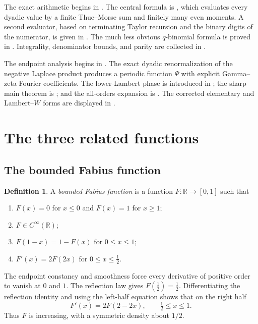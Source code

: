 \documentclass[11pt]{article}
\numberwithin{equation}{section}
\theoremstyle{definition}
\newtheorem{definition}[theorem]{Definition}
\theoremstyle{remark}
\newcommand{\R}{\mathbb{R}}
\newcommand{\half}{\tfrac12}
\begin{document}
The exact arithmetic begins in .  The central
formula is , which evaluates every dyadic value by a
finite Thue--Morse sum and finitely many even moments.  A second evaluator,
based on terminating Taylor recursion and the binary digits of the numerator,
is given in .  The much less obvious
$q$-binomial formula is proved in .  Integrality,
denominator bounds, and parity are collected in .

The endpoint analysis begins in .  The exact dyadic
renormalization of the negative Laplace product produces a periodic function
$\Psi$ with explicit Gamma--zeta Fourier coefficients.  The lower-Lambert
phase is introduced in ; the sharp main theorem is
; and the all-orders expansion is
.  The corrected elementary and Lambert--$W$ forms
are displayed in .

\section{The three related functions}\label{sec:three-functions}

\subsection{The bounded Fabius function}

\begin{definition}\label{def:bounded-fabius}
A \emph{bounded Fabius function} is a function $F:\R\to[0,1]$ such that
\begin{enumerate}[label=\textup{(\roman*)}]
\item $F(x)=0$ for $x\le0$ and $F(x)=1$ for $x\ge1$;
\item $F\in C^\infty(\R)$;
\item $F(1-x)=1-F(x)$ for $0\le x\le1$;
\item $F'(x)=2F(2x)$ for $0\le x\le\half$.
\end{enumerate}
\end{definition}

The endpoint constancy and smoothness force every derivative of positive
order to vanish at $0$ and $1$.  The reflection law gives $F(\half)=\half$.
Differentiating the reflection identity and using the left-half equation
shows that on the right half
\begin{equation}\label{eq:F-right-derivative}
 F'(x)=2F(2-2x),\qquad \half\le x\le1.
\end{equation}
Thus $F$ is increasing, with a symmetric density about $1/2$.
\end{document}
